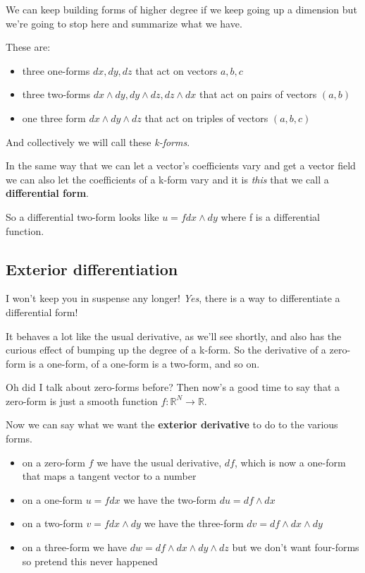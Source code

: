 \documentclass{article}
\begin{document}
We can keep building forms of higher degree if we keep going up a dimension but
we're going to stop here and summarize what we have.

These are:

\begin{itemize}
  \item three one-forms $dx, dy, dz$ that act on vectors $a, b, c$
  \item three two-forms $dx \wedge dy, dy \wedge dz, dz \wedge dx$ that act on
    pairs of vectors $(a, b)$
  \item one three form $dx \wedge dy \wedge dz$ that act on triples of vectors
    $(a, b, c)$
\end{itemize}

And collectively we will call these \textit{k-forms}.

In the same way that we can let a vector's coefficients vary and get a vector
field we can also let the coefficients of a k-form vary and
it is \textit{this} that we call a \textbf{differential form}.

So a differential two-form looks like $u = f dx \wedge dy$ where f is a
differential function.

\subsection {Exterior differentiation}

I won't keep you in suspense any longer! \textit{Yes}, there is a way to
differentiate a differential form!

It behaves a lot like the usual derivative, as we'll see shortly, and also has
the curious effect of bumping up the degree of a k-form. So the derivative of a
zero-form is a one-form, of a one-form is a two-form, and so on.

Oh did I talk about zero-forms before? Then now's a good time to say that a
zero-form is just a smooth function $f : \mathbb{R}^{N} \to \mathbb{R}$.

Now we can say what we want the \textbf{exterior derivative} to do to the
various forms.

\begin{itemize}
  \item on a zero-form $f$ we have the usual derivative, $df$, which is
    now a one-form that maps a tangent vector to a number
  \item on a one-form $u = f dx$ we have the two-form $du = df \wedge dx$
  \item on a two-form $v = f dx \wedge dy$ we have the three-form $dv = df \wedge dx \wedge
    dy$
  \item on a three-form we have $dw = df \wedge dx \wedge dy \wedge dz$ but
    we don't want four-forms so pretend this never happened
\end{itemize}
\end{document}
